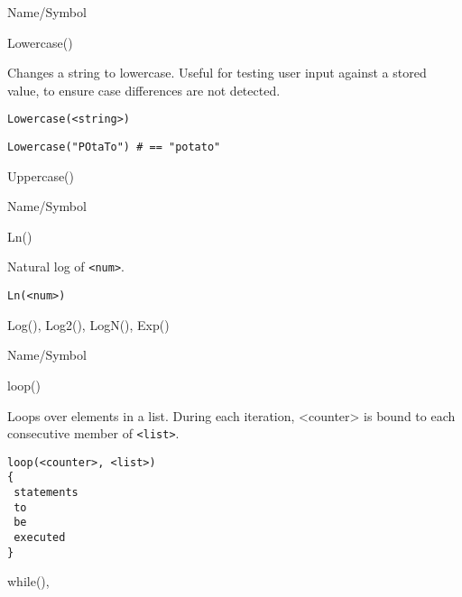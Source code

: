 \rl


\begin{desc}{Name/Symbol}
\item[Name/Symbol]	Lowercase()

\item[Description]	Changes a string to lowercase.  Useful for testing user
		input against a stored value, to ensure case differences
		are not detected.

\item[Usage]
\begin{verbatim}
Lowercase(<string>)
\end{verbatim}

\item[Example]
\begin{verbatim}
Lowercase("POtaTo")	# == "potato"
\end{verbatim}

\item[See Also]	Uppercase()
\end{desc}

\rl


\begin{desc}{Name/Symbol}
\item[Name/Symbol]	Ln()

\item[Description]	Natural log of \verb+<num>+.

\item[Usage]		
\begin{verbatim}
Ln(<num>)
\end{verbatim}

\item[Example]	

\item[See Also]	Log(), Log2(), LogN(), Exp()     
\end{desc}

\rl


\begin{desc}{Name/Symbol}
\item[Name/Symbol]	loop()

\item[Description]	Loops over elements in a list.  During each iteration, <counter> is bound to each consecutive member of \verb+<list>+.

\item[Usage]		
\begin{verbatim}
loop(<counter>, <list>)
{
 statements
 to
 be	   
 executed
}
\end{verbatim}

\item[Example]	

\item[See Also]	while(), {}
\end{desc}

